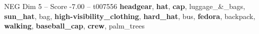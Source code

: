 \begin{textsample}{NEG Dim 5 – Score -7.00 – t007556}  \label{ex:f5_neg_011}
\textbf{headgear}, \textbf{hat}, \textbf{cap}, luggage\_\&\_bags, \textbf{sun\_hat}, bag, \textbf{high-visibility\_clothing}, \textbf{hard\_hat}, bus, \textbf{fedora}, backpack, \textbf{walking}, \textbf{baseball\_cap}, \textbf{crew}, palm\_trees

\end{textsample}
